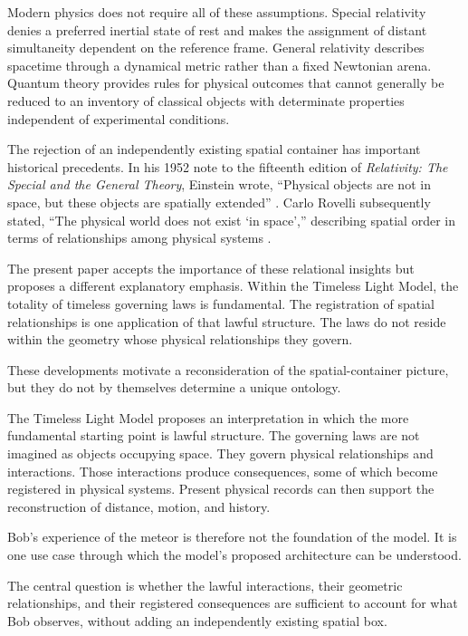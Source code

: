 \documentclass[12pt,onecolumn]{article}
\begin{document}
Modern physics does not require all of these assumptions. Special relativity denies a preferred inertial state of rest and makes the assignment of distant simultaneity dependent on the reference frame. General relativity describes spacetime through a dynamical metric rather than a fixed Newtonian arena. Quantum theory provides rules for physical outcomes that cannot generally be reduced to an inventory of classical objects with determinate properties independent of experimental conditions.

The rejection of an independently existing spatial container has important historical precedents. In his 1952 note to the fifteenth edition of \emph{Relativity: The Special and the General Theory}, Einstein wrote, ``Physical objects are not in space, but these objects are spatially extended'' \cite{EinsteinRelativity}. Carlo Rovelli subsequently stated, ``The physical world does not exist `in space','' describing spatial order in terms of relationships among physical systems \cite{Rovelli2004}.

The present paper accepts the importance of these relational insights but proposes a different explanatory emphasis. Within the Timeless Light Model, the totality of timeless governing laws is fundamental. The registration of spatial relationships is one application of that lawful structure. The laws do not reside within the geometry whose physical relationships they govern.

These developments motivate a reconsideration of the spatial-container picture, but they do not by themselves determine a unique ontology.

The Timeless Light Model proposes an interpretation in which the more fundamental starting point is lawful structure. The governing laws are not imagined as objects occupying space. They govern physical relationships and interactions. Those interactions produce consequences, some of which become registered in physical systems. Present physical records can then support the reconstruction of distance, motion, and history.

Bob's experience of the meteor is therefore not the foundation of the model. It is one use case through which the model's proposed architecture can be understood.

The central question is whether the lawful interactions, their geometric relationships, and their registered consequences are sufficient to account for what Bob observes, without adding an independently existing spatial box.
\end{document}
